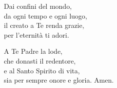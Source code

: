 \spazio

\strofa Dai confini del mondo,\\
da ogni tempo e ogni luogo,\\
il creato a Te renda grazie,\\
per l'eternità ti adori.

\spazio


\spazio

\strofa A Te Padre la lode,\\
che donasti il redentore,\\
e al Santo Spirito di vita,\\
sia per sempre onore e gloria. Amen.
